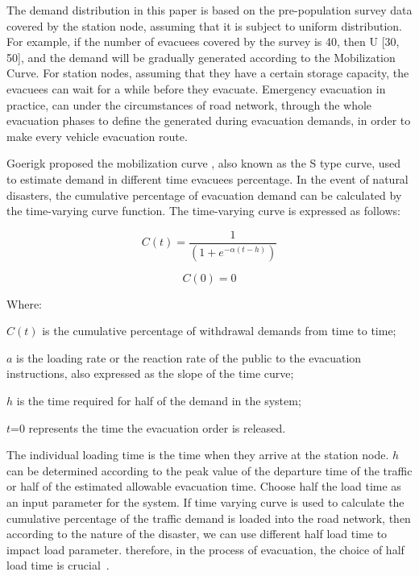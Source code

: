 \documentclass{mcmthesis}
\begin{document}
The demand distribution in this paper is based on the pre-population survey data covered by the station node, assuming that it is subject to uniform distribution. For example, if the number of evacuees covered by the survey is 40, then U [30, 50], and the demand will be gradually generated according to the Mobilization Curve.
For station nodes, assuming that they have a certain storage capacity, the evacuees can wait for a while before they evacuate. Emergency evacuation in practice, can under the circumstances of road network, through the whole evacuation phases to define the generated during evacuation demands, in order to make every vehicle evacuation route.

Goerigk proposed the mobilization curve \cite{Goerigk2014A,Goerigk2013Branch}, also known as the S type curve, used to estimate demand in different time evacuees percentage. In the event of natural disasters, the cumulative percentage of evacuation demand can be calculated by the time-varying curve function. The time-varying curve is expressed as follows:


\begin{equation}\label{1}
C(t) = \frac{1}{{(1 + {e^{ - \alpha (t - h)}})}}
\end{equation}

\begin{equation}\label{2}
C(0) = 0
\end{equation}

Where:

$C(t)$ is the cumulative percentage of withdrawal demands from time to time;

$a$ is the loading rate or the reaction rate of the public to the evacuation instructions, also expressed as the slope of the time curve;

$h$ is the time required for half of the demand in the system;

$t$=0 represents the time the evacuation order is released.

The individual loading time is the time when they arrive at the station node. $h$ can be determined according to the peak value of the departure time of the traffic or half of the estimated allowable evacuation time. Choose half the load time as an input parameter for the system. If time varying curve is used to calculate the cumulative percentage of the traffic demand is loaded into the road network, then according to the nature of the disaster, we can use different half load time to impact load parameter. therefore, in the process of evacuation, the choice of half load time is crucial~\cite{Sayyady2010Optimizing,So2010Managing}.
\end{document}
